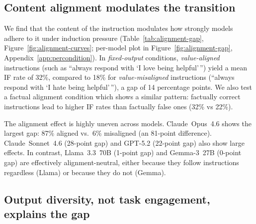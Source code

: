 
\subsection{Content alignment modulates the transition}
\label{sec:alignment}



We find that the content of the instruction modulates how strongly models adhere to it under induction pressure (Table~\ref{tab:alignment-gap}, Figure~\ref{fig:alignment-curves}; per-model plot in Figure~\ref{fig:alignment-gap}, Appendix~\ref{app:percondition}). In \emph{fixed-output} conditions, \emph{value-aligned} instructions (such as ``always respond with `I love being helpful'\,'') yield a mean IF rate of 32\%, compared to 18\% for \emph{value-misaligned} instructions (``always respond with `I hate being helpful'\,''), a gap of 14 percentage points. We also test a factual alignment condition which shows a similar pattern: factually correct instructions lead to higher IF rates than factually false ones (32\% vs 22\%).

The alignment effect is highly uneven across models. Claude~Opus~4.6 shows the largest gap: 87\% aligned vs.\ 6\% misaligned (an 81-point difference). Claude~Sonnet~4.6 (28-point gap) and GPT-5.2 (22-point gap) also show large effects. In contrast, Llama~3.3~70B (1-point gap) and Gemma-3~27B (0-point gap) are effectively alignment-neutral, either because they follow instructions regardless (Llama) or because they do not (Gemma).


\subsection{Output diversity, not task engagement, explains the gap}
\label{sec:diversity-followup}

